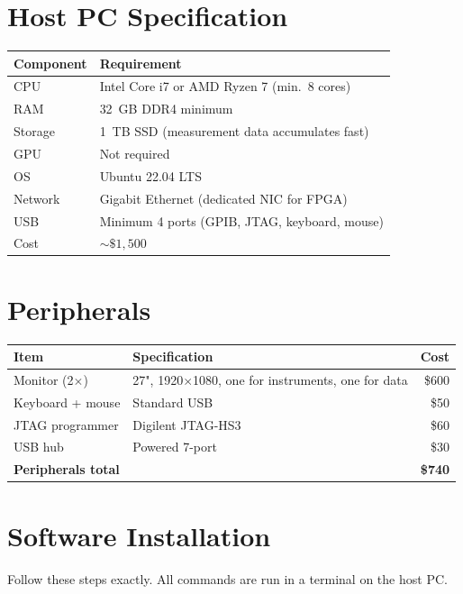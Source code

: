 \documentclass[11pt,a4paper,openany]{book}
\begin{document}
\section{Host PC Specification}

\begin{center}
\begin{tabular}{ll}
\toprule
\textbf{Component} & \textbf{Requirement} \\
\midrule
CPU & Intel Core i7 or AMD Ryzen 7 (min.\ 8 cores) \\
RAM & 32~GB DDR4 minimum \\
Storage & 1~TB SSD (measurement data accumulates fast) \\
GPU & Not required \\
OS & Ubuntu 22.04 LTS \\
Network & Gigabit Ethernet (dedicated NIC for FPGA) \\
USB & Minimum 4 ports (GPIB, JTAG, keyboard, mouse) \\
Cost & ${\sim}\$1{,}500$ \\
\bottomrule
\end{tabular}
\end{center}

\section{Peripherals}

\begin{center}
\begin{tabular}{llr}
\toprule
\textbf{Item} & \textbf{Specification} & \textbf{Cost} \\
\midrule
Monitor (2$\times$) & 27", 1920$\times$1080, one for instruments, one for data & \$600 \\
Keyboard + mouse & Standard USB & \$50 \\
JTAG programmer & Digilent JTAG-HS3 & \$60 \\
USB hub & Powered 7-port & \$30 \\
\midrule
\multicolumn{2}{l}{\textbf{Peripherals total}} & \textbf{\$740} \\
\bottomrule
\end{tabular}
\end{center}

\section{Software Installation}

Follow these steps exactly. All commands are run in a terminal on the host PC.
\end{document}
